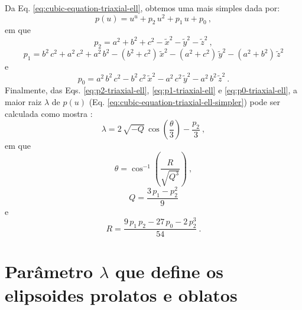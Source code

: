 Da Eq. \ref{eq:cubic-equation-triaxial-ell}, obtemos uma mais simples
dada por:
\begin{equation}
p(u) =  u^{u} + p_{2} \, u^{2} + p_{1} \, u + p_{0} \: ,
\label{eq:cubic-equation-triaxial-ell-simpler}
\end{equation}
em que
\begin{equation}
p_{2} = a^{2} + b^{2} + c^{2} - \tilde{x}^{2} - \tilde{y}^{2} - \tilde{z}^{2} \: ,
\label{eq:p2-triaxial-ell}
\end{equation}
\begin{equation}
p_{1} = b^{2} \, c^{2} + a^{2} \, c^{2} + a^{2} \, b^{2} 
- (b^{2} + c^{2}) \, \tilde{x}^{2}
- (a^{2} + c^{2}) \, \tilde{y}^{2} 
- (a^{2} + b^{2}) \, \tilde{z}^{2}
\label{eq:p1-triaxial-ell}
\end{equation}
e
\begin{equation}
p_{0} =  a^{2} \, b^{2} \, c^{2} - b^{2} \, c^{2} \, 
\tilde{x}^{2} - a^{2} \, c^{2} \, \tilde{y}^{2} - a^{2} \, 
b^{2} \, \tilde{z}^{2} \: .
\label{eq:p0-triaxial-ell}
\end{equation}
Finalmente, das Eqs. \ref{eq:p2-triaxial-ell}, 
\ref{eq:p1-triaxial-ell} e \ref{eq:p0-triaxial-ell},
a maior raiz $\lambda$ de $p(u)$ 
(Eq. \ref{eq:cubic-equation-triaxial-ell-simpler}) pode ser
calculada como mostra \citep{weisstein2017}:
\begin{equation}
\lambda = 2 \, \sqrt{-Q} \, \cos \left( \frac{\theta}{3}\right) - \frac{p_{2}}{3} \: ,
\label{eq:lambda-triaxial-ell}
\end{equation}
em que
\begin{equation}
\theta = \cos^{-1} \left( \frac{R}{\sqrt{Q^{3}}} \right) \: ,
\label{eq:theta-triaxial-ell}
\end{equation}
\begin{equation}
Q = \frac{3 \, p_{1} - p_{2}^{2}}{9}
\label{eq:Q-triaxial-ell}
\end{equation}
e
\begin{equation}
R = \frac{9 \, p_{1} \, p_{2} - 27 \, p_{0} - 2 \, p_{2}^{3}}{54} \: .
\label{eq:R-triaxial-ell}
\end{equation}

\section{Parâmetro $\lambda$ que define os elipsoides prolatos e oblatos}

